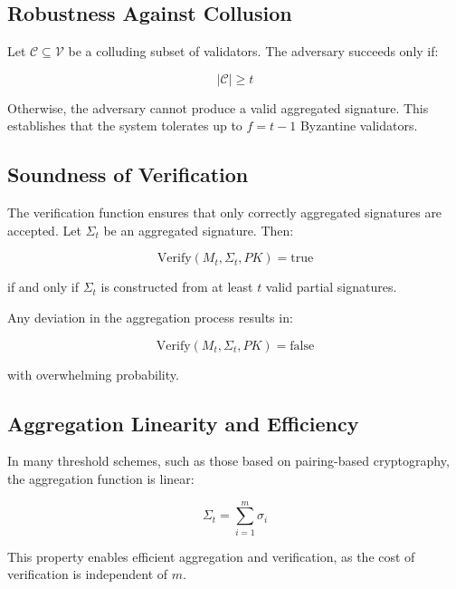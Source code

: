 \subsection{Robustness Against Collusion}

Let $\mathcal{C} \subseteq \mathcal{V}$ be a colluding subset of validators. The adversary succeeds only if:

\begin{equation}
|\mathcal{C}| \geq t
\end{equation}

Otherwise, the adversary cannot produce a valid aggregated signature. This establishes that the system tolerates up to $f = t - 1$ Byzantine validators.

\subsection{Soundness of Verification}

The verification function ensures that only correctly aggregated signatures are accepted. Let $\Sigma_t$ be an aggregated signature. Then:

\begin{equation}
\text{Verify}(M_t, \Sigma_t, PK) = \text{true}
\end{equation}

if and only if $\Sigma_t$ is constructed from at least $t$ valid partial signatures.

Any deviation in the aggregation process results in:

\begin{equation}
\text{Verify}(M_t, \Sigma_t, PK) = \text{false}
\end{equation}

with overwhelming probability.

\subsection{Aggregation Linearity and Efficiency}

In many threshold schemes, such as those based on pairing-based cryptography, the aggregation function is linear:

\begin{equation}
\Sigma_t = \sum_{i=1}^{m} \sigma_i
\end{equation}

This property enables efficient aggregation and verification, as the cost of verification is independent of $m$.

